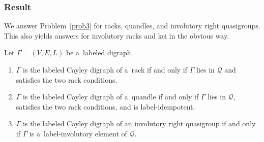 \documentclass{jonasart}
\begin{document}
	\subsubsection{Result} 
    
    We answer Problem~\ref{prob3} for racks, quandles, and involutory right quasigroups. This also yields answers for involutory racks and kei in the obvious way.
    
	\begin{theorem}\label{thm:lab2}
		Let $\Gamma=(V,E,L)$ be a~labeled digraph.
		\begin{enumerate}
			\item $\Gamma$ is the labeled Cayley digraph of a~rack if and only if $\Gamma$ lies in $ \mathcal{Q}$ and satisfies the two rack conditions.
			\item $\Gamma$ is the labeled Cayley digraph of a~quandle if and only if $\Gamma$ lies in $ \mathcal{Q}$, satisfies the two rack conditions, and is label-idempotent.
			\item $\Gamma$ is the labeled Cayley digraph of an involutory right quasigroup if and only if $\Gamma$ is a~label-involutory element of $ \mathcal{Q}$.
		\end{enumerate}
	\end{theorem}
\end{document}
